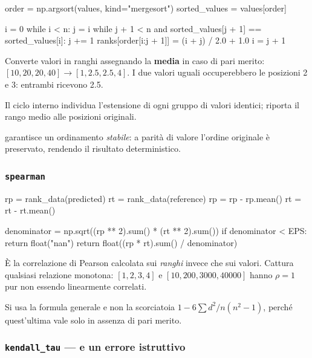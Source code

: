 \begin{idebox}
\begin{pycode}
order = np.argsort(values, kind="mergesort")
sorted_values = values[order]

i = 0
while i < n:
    j = i
    while j + 1 < n and sorted_values[j + 1] == sorted_values[i]:
        j += 1
    ranks[order[i:j + 1]] = (i + j) / 2.0 + 1.0
    i = j + 1
\end{pycode}
\end{idebox}

Converte valori in ranghi assegnando la \textbf{media} in caso di pari merito:
$[10, 20, 20, 40] \to [1, 2.5, 2.5, 4]$. I due valori uguali occuperebbero le posizioni 2 e 3:
entrambi ricevono 2.5.

Il ciclo interno individua l'estensione di ogni gruppo di valori identici; 
riporta il rango medio alle posizioni originali.

 garantisce un ordinamento \emph{stabile}: a parità di valore l'ordine
originale è preservato, rendendo il risultato deterministico.

\subsubsection{\texttt{spearman}}

\begin{idebox}
\begin{pycode}
rp = rank_data(predicted)
rt = rank_data(reference)
rp = rp - rp.mean()
rt = rt - rt.mean()

denominator = np.sqrt((rp ** 2).sum() * (rt ** 2).sum())
if denominator < EPS:
    return float("nan")
return float((rp * rt).sum() / denominator)
\end{pycode}
\end{idebox}

È la correlazione di Pearson calcolata sui \emph{ranghi} invece che sui valori. Cattura qualsiasi
relazione monotona: $[1,2,3,4]$ e $[10, 200, 3000, 40000]$ hanno $\rho = 1$ pur non essendo
linearmente correlati.

Si usa la formula generale e non la scorciatoia $1 - 6\sum d^2 / n(n^2-1)$, perché quest'ultima
vale solo in assenza di pari merito.

\subsubsection{\texttt{kendall\_tau} --- e un errore istruttivo}

